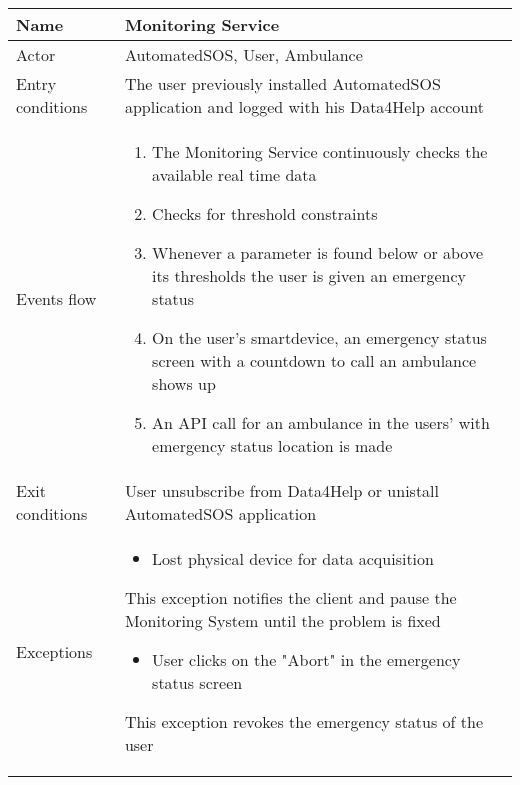 \begin{table}[h!]
\begin{tabular}{|l|p{12cm}|}
\hline
Name             & Monitoring Service \\ \hline
Actor            & AutomatedSOS, User, Ambulance \\ \hline
Entry conditions & The user previously installed AutomatedSOS application and logged with his Data4Help account\\ \hline
Events flow      & \begin{enumerate}
\item The Monitoring Service continuously checks the available real time data
\item Checks for threshold constraints
\item Whenever a parameter is found below or above its thresholds the user is given an emergency status
\item On the user's smartdevice, an emergency status screen with a countdown to call an ambulance shows up
\item An API call for an ambulance in the users' with emergency status location is made
\end{enumerate} \\ \hline
Exit conditions  & User unsubscribe from Data4Help or unistall AutomatedSOS application \\ \hline
Exceptions       &  \begin{itemize}
\item Lost physical device for data acquisition
\end{itemize} This exception notifies the client and pause the Monitoring System until the problem is fixed\begin{itemize}
\item User clicks on the "Abort" in the emergency status screen
\end{itemize} This exception revokes the emergency status of the user \\ \hline
\end{tabular}
\end{table}

